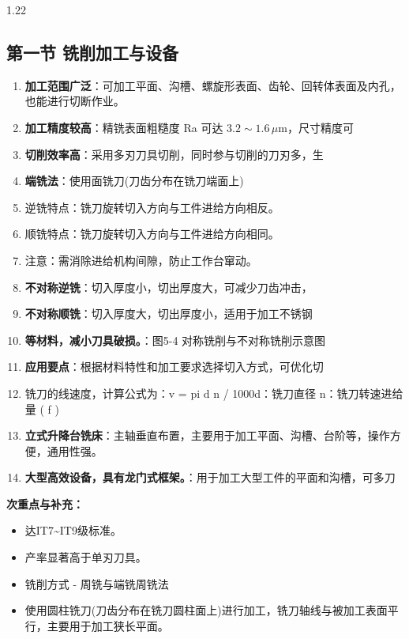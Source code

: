 \documentclass[12pt,a4paper]{article}
\begin{document}
\begin{spacing}{1.22}
\subsection{第一节 铣削加工与设备}
\begin{tcolorbox}[colback=yellow!6,colframe=red!55!black,title=重点,left=1mm,right=1mm]
\begin{enumerate}[leftmargin=2.2em,label=\arabic*.]
  \item \textbf{加工范围广泛}：可加工平面、沟槽、螺旋形表面、齿轮、回转体表面及内孔，也能进行切断作业。
  \item \textbf{加工精度较高}：精铣表面粗糙度 Ra 可达 $3.2\sim1.6\,\mu\text{m}$，尺寸精度可
  \item \textbf{切削效率高}：采用多刃刀具切削，同时参与切削的刀刃多，生
  \item \textbf{端铣法}：使用面铣刀(刀齿分布在铣刀端面上)
  \item 逆铣特点：铣刀旋转切入方向与工件进给方向相反。
  \item 顺铣特点：铣刀旋转切入方向与工件进给方向相同。
  \item 注意：需消除进给机构间隙，防止工作台窜动。
  \item \textbf{不对称逆铣}：切入厚度小，切出厚度大，可减少刀齿冲击，
  \item \textbf{不对称顺铣}：切入厚度大，切出厚度小，适用于加工不锈钢
  \item \textbf{等材料，减小刀具破损。}：图5-4 对称铣削与不对称铣削示意图
  \item \textbf{应用要点}：根据材料特性和加工要求选择切入方式，可优化切
  \item 铣刀的线速度，计算公式为：v = pi d n / 1000d：铣刀直径 n：铣刀转速进给量 ( f )
  \item \textbf{立式升降台铣床}：主轴垂直布置，主要用于加工平面、沟槽、台阶等，操作方便，通用性强。
  \item \textbf{大型高效设备，具有龙门式框架。}：用于加工大型工件的平面和沟槽，可多刀
\end{enumerate}
\end{tcolorbox}
\noindent\textbf{次重点与补充：}
\begin{itemize}[leftmargin=2.2em,label=--]
  \item 达IT7\textasciitilde{}IT9级标准。
  \item 产率显著高于单刃刀具。
  \item 铣削方式 - 周铣与端铣周铣法
  \item 使用圆柱铣刀(刀齿分布在铣刀圆柱面上)进行加工，铣刀轴线与被加工表面平行，主要用于加工狭长平面。

\end{itemize}
\end{spacing}
\end{document}
